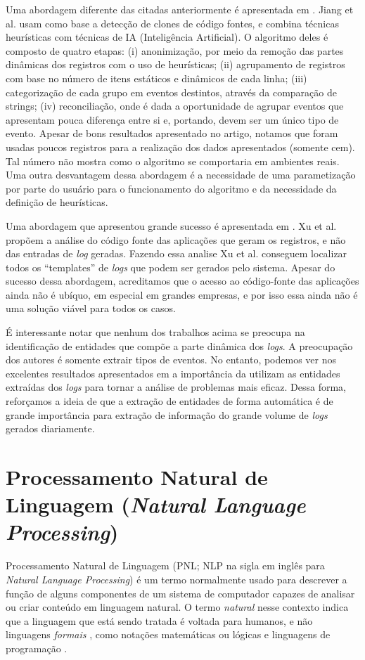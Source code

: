 \documentclass[
	12pt,				%
	openright,			%
	twoside,			%
	a4paper,			%
	english,			%
	spanish,			%
	brazil,				%
	]{abntex2}
\begin{document}
Uma abordagem diferente das citadas anteriormente é apresentada em \cite{jiang2008automated}. Jiang et al. usam como base a detecção de clones de código fontes, e combina técnicas heurísticas com técnicas de IA (Inteligência Artificial).  O algoritmo deles é composto de quatro etapas: (i) anonimização, por meio da remoção das partes dinâmicas dos registros com o uso de heurísticas; (ii) agrupamento de registros com base no número de itens estáticos e dinâmicos de cada linha; (iii) categorização de cada grupo em eventos destintos, através da comparação de strings; (iv) reconciliação, onde é dada a oportunidade de agrupar eventos que apresentam pouca diferença entre si e, portando, devem ser um único tipo de evento. Apesar de bons resultados apresentado no artigo, notamos que foram usadas poucos registros para a realização dos dados apresentados (somente cem). Tal número não mostra como o algoritmo se comportaria em ambientes reais. Uma outra desvantagem dessa abordagem é a necessidade de uma parametização por parte do usuário para o funcionamento do algoritmo e da necessidade da definição de heurísticas.

Uma abordagem que apresentou grande sucesso é apresentada em \cite{xu2009detecting}. Xu et al. propõem a análise do código fonte das aplicações que geram os registros, e não das entradas de \emph{log} geradas. Fazendo essa analise Xu et al. conseguem localizar todos os ``templates'' de \emph{logs} que podem ser gerados pelo sistema. Apesar do sucesso dessa abordagem, acreditamos que o acesso ao código-fonte das aplicações ainda não é ubíquo, em especial em grandes empresas, e por isso essa ainda não é uma solução viável para todos os casos.

É interessante notar que nenhum dos trabalhos acima se preocupa na identificação de entidades que compõe a parte dinâmica dos \emph{logs}. A preocupação dos autores é somente extrair tipos de eventos. No entanto, podemos ver nos excelentes resultados apresentados em \cite{xu2008mining,yen2013beehive} a importância da utilizam as entidades extraídas dos \emph{logs} para tornar a análise de problemas mais eficaz. Dessa forma, reforçamos a ideia de que a extração de entidades de forma automática é de grande importância para extração de informação do grande volume de \emph{logs} gerados diariamente.

\section{Processamento Natural de Linguagem (\emph{Natural Language Processing})}
Processamento Natural de Linguagem (PNL; NLP na sigla em inglês para \emph{Natural Language Processing}) é um termo normalmente usado para descrever a função de alguns componentes de um sistema de computador capazes de analisar ou criar conteúdo em linguagem natural. O termo \emph{natural} nesse contexto indica que a linguagem que está sendo tratada é voltada para humanos, e não linguagens \emph{formais} , como notações matemáticas ou lógicas e linguagens de programação \cite{jackson2002natural}.
\end{document}

